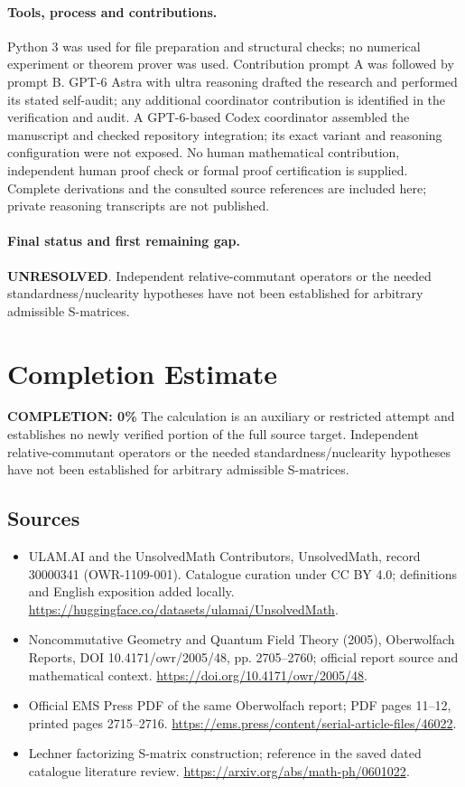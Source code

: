 \documentclass[11pt]{article}
\begin{document}
\paragraph{Tools, process and contributions.}
Python 3 was used for file preparation and structural checks; no numerical experiment or theorem prover was used. Contribution prompt A was followed by prompt B. GPT-6 Astra with ultra reasoning drafted the research and performed its stated self-audit; any additional coordinator contribution is identified in the verification and audit. A GPT-6-based Codex coordinator assembled the manuscript and checked repository integration; its exact variant and reasoning configuration were not exposed. No human mathematical contribution, independent human proof check or formal proof certification is supplied. Complete derivations and the consulted source references are included here; private reasoning transcripts are not published.

\paragraph{Final status and first remaining gap.}
\textbf{UNRESOLVED}. Independent relative-commutant operators or the needed standardness/nuclearity hypotheses have not been established for arbitrary admissible S-matrices.

\section{Completion Estimate}
\noindent\textbf{COMPLETION: 0\%}
The calculation is an auxiliary or restricted attempt and establishes no newly verified portion of the full source target. Independent relative-commutant operators or the needed standardness/nuclearity hypotheses have not been established for arbitrary admissible S-matrices.

\subsection{Sources}
\begin{itemize}
\item[\hypertarget{source:30000341:1}{S1}] ULAM.AI and the UnsolvedMath Contributors, UnsolvedMath, record 30000341 (OWR-1109-001). Catalogue curation under CC BY 4.0; definitions and English exposition added locally.
\url{https://huggingface.co/datasets/ulamai/UnsolvedMath}.
\item[\hypertarget{source:30000341:2}{S2}] Noncommutative Geometry and Quantum Field Theory (2005), Oberwolfach Reports, DOI 10.4171/owr/2005/48, pp. 2705--2760; official report source and mathematical context.
\url{https://doi.org/10.4171/owr/2005/48}.
\item[\hypertarget{source:30000341:3}{S3}] Official EMS Press PDF of the same Oberwolfach report; PDF pages 11--12, printed pages 2715--2716.
\url{https://ems.press/content/serial-article-files/46022}.
\item[\hypertarget{source:30000341:4}{S4}] Lechner factorizing S-matrix construction; reference in the saved dated catalogue literature review.
\url{https://arxiv.org/abs/math-ph/0601022}.
\end{itemize}
\label{end:30000341}
\end{document}

